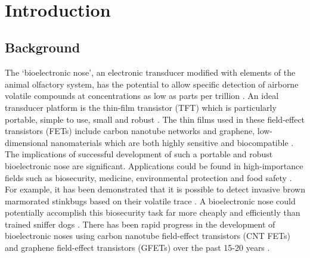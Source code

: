 \documentclass[
  a4paper,
]{scrbook}
\begin{document}
\clearpage
\newpage
\thispagestyle{empty} %
\mbox{~}
\clearpage
\newpage

\makeatletter
\setlength{\@fptop}{0pt plus 1fil}
\setlength{\@fpbot}{0pt plus 1fil}
\makeatother

\pagestyle{headings}
\mainmatter
{}

\hypertarget{introduction}{%
\chapter{Introduction}\label{introduction}}

\hypertarget{background}{%
\section{Background}\label{background}}

The `bioelectronic nose', an electronic transducer modified with
elements of the animal olfactory system, has the potential to allow
specific detection of airborne volatile compounds at concentrations as
low as parts per trillion
\autocite{Glatz2011,Kwon2015,Dung2018,Kim2022a}. An ideal transducer
platform is the thin-film transistor (TFT) which is particularly
portable, simple to use, small and robust
\autocite{Kauffman2008,Khan2020}. The thin films used in these
field-effect transistors (FETs) include carbon nanotube networks and
graphene, low-dimensional nanomaterials which are both highly sensitive
and biocompatible \autocite{Shkodra2021}. The implications of successful
development of such a portable and robust bioelectronic nose are
significant. Applications could be found in high-importance fields such
as biosecurity, medicine, environmental protection and food safety
\autocite{Dung2018,Arakawa2019,Yang2017,Son2017}. For example, it has
been demonstrated that it is possible to detect invasive brown
marmorated stinkbugs based on their volatile trace \autocite{Moser2020}.
A bioelectronic nose could potentially accomplish this biosecurity task
far more cheaply and efficiently than trained sniffer dogs
\autocite{Lee2010,Moon2020,Terutsuki2020}. There has been rapid progress
in the development of bioelectronic noses using carbon nanotube
field-effect transistors (CNT FETs) and graphene field-effect
transistors (GFETs) over the past 15-20 years
\autocite{Yoon2009,Lee2010,Yang2018}.
\end{document}
